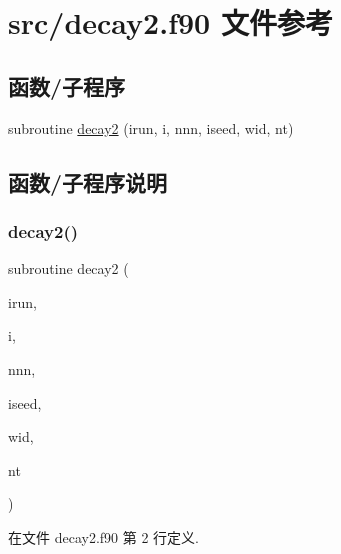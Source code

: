 \hypertarget{decay2_8f90}{}\section{src/decay2.f90 文件参考}
\label{decay2_8f90}
\subsection*{函数/子程序}
\begin{DoxyCompactItemize}
\item 
subroutine \mbox{\hyperlink{decay2_8f90_ad2632dbc63a2453ed7043d6502578409}{decay2}} (irun, i, nnn, iseed, wid, nt)
\end{DoxyCompactItemize}


\subsection{函数/子程序说明}
\mbox{\label{decay2_8f90_ad2632dbc63a2453ed7043d6502578409}} 
\subsubsection{\texorpdfstring{decay2()}{decay2()}}
{\footnotesize\ttfamily subroutine decay2 (\begin{DoxyParamCaption}\item[{}]{irun,  }\item[{}]{i,  }\item[{}]{nnn,  }\item[{}]{iseed,  }\item[{}]{wid,  }\item[{}]{nt }\end{DoxyParamCaption})}



在文件 decay2.\+f90 第 2 行定义.

